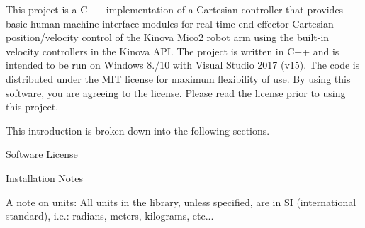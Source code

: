 This project is a C++ implementation of a Cartesian controller that provides basic human-\/machine interface modules for real-\/time end-\/effector Cartesian position/velocity control of the Kinova Mico2 robot arm using the built-\/in velocity controllers in the Kinova A\+PI. The project is written in C++ and is intended to be run on Windows 8./10 with Visual Studio 2017 (v15). The code is distributed under the M\+IT license for maximum flexibility of use. By using this software, you are agreeing to the license. Please read the license prior to using this project.

This introduction is broken down into the following sections.
\begin{DoxyItemize}
\item \hyperlink{license}{Software License}
\item \hyperlink{install}{Installation Notes}
\end{DoxyItemize}

A note on units\+: All units in the library, unless specified, are in SI (international standard), i.\+e.\+: radians, meters, kilograms, etc... 
